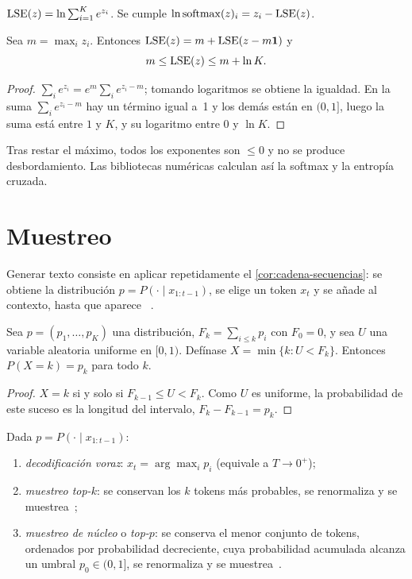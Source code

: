 \begin{definicion}
$\operatorname{LSE}(z)=\ln\sum_{i=1}^{K}e^{z_i}$. Se cumple $\ln\operatorname{softmax}(z)_i=z_i-\operatorname{LSE}(z)$.
\end{definicion}

\begin{proposicion}\label{prop:lse}
Sea $m=\max_i z_i$. Entonces $\operatorname{LSE}(z)=m+\operatorname{LSE}(z-m\mathbf{1})$ y
\[
m\le\operatorname{LSE}(z)\le m+\ln K.
\]
\end{proposicion}

\begin{proof}
$\sum_i e^{z_i}=e^{m}\sum_i e^{z_i-m}$; tomando logaritmos se obtiene la igualdad. En la suma $\sum_i e^{z_i-m}$ hay un término igual a~1 y los demás están en $(0,1]$, luego la suma está entre $1$ y $K$, y su logaritmo entre $0$ y $\ln K$.
\end{proof}

Tras restar el máximo, todos los exponentes son $\le 0$ y no se produce desbordamiento. Las bibliotecas numéricas calculan así la softmax y la entropía cruzada.

\section{Muestreo}

Generar texto consiste en aplicar repetidamente el \cref{cor:cadena-secuencias}: se obtiene la distribución $p=P(\cdot\mid x_{1:t-1})$, se elige un token $x_t$ y se añade al contexto, hasta que aparece \fin~\cite[§3.4]{jm3}.

\begin{proposicion}\label{prop:muestreo}
Sea $p=(p_1,\dots,p_K)$ una distribución, $F_k=\sum_{i\le k}p_i$ con $F_0=0$, y sea $U$ una variable aleatoria uniforme en $[0,1)$. Defínase $X=\min\{k: U<F_k\}$. Entonces $P(X=k)=p_k$ para todo $k$.
\end{proposicion}

\begin{proof}
$X=k$ si y solo si $F_{k-1}\le U<F_k$. Como $U$ es uniforme, la probabilidad de este suceso es la longitud del intervalo, $F_k-F_{k-1}=p_k$.
\end{proof}

\begin{definicion}
Dada $p=P(\cdot\mid x_{1:t-1})$:
\begin{enumerate}
  \item \emph{decodificación voraz}: $x_t=\arg\max_i p_i$ (equivale a $T\to 0^{+}$);
  \item \emph{muestreo top-$k$}: se conservan los $k$ tokens más probables, se renormaliza y se muestrea~\cite{fan};
  \item \emph{muestreo de núcleo} o \emph{top-$p$}: se conserva el menor conjunto de tokens, ordenados por probabilidad decreciente, cuya probabilidad acumulada alcanza un umbral $p_0\in(0,1]$, se renormaliza y se muestrea~\cite{holtzman}.
\end{enumerate}
\end{definicion}

